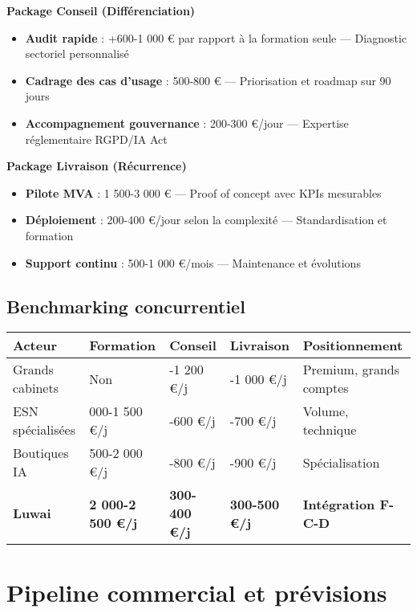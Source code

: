 \textbf{Package Conseil (Différenciation)}
\begin{itemize}
    \item \textbf{Audit rapide} : +600-1 000 € par rapport à la formation seule — Diagnostic sectoriel personnalisé
    \item \textbf{Cadrage des cas d’usage} : 500-800 € — Priorisation et roadmap sur 90 jours
    \item \textbf{Accompagnement gouvernance} : 200-300 €/jour — Expertise réglementaire RGPD/IA Act
\end{itemize}

\textbf{Package Livraison (Récurrence)}
\begin{itemize}
    \item \textbf{Pilote MVA} : 1 500-3 000 € — Proof of concept avec KPIs mesurables
    \item \textbf{Déploiement} : 200-400 €/jour selon la complexité — Standardisation et formation
    \item \textbf{Support continu} : 500-1 000 €/mois — Maintenance et évolutions
\end{itemize}

\subsection{Benchmarking concurrentiel}

\begin{longtable}{@{}>{\raggedright\arraybackslash}p{3.5cm}>{\raggedright\arraybackslash}p{2.8cm}>{\raggedright\arraybackslash}p{2.8cm}>{\raggedright\arraybackslash}p{2.8cm}>{\raggedright\arraybackslash}p{3.5cm}@{}}
\toprule
\textbf{Acteur} & \textbf{Formation} & \textbf{Conseil} & \textbf{Livraison} & \textbf{Positionnement} \\
\midrule
Grands cabinets & Non & 800-1 200 €/j & 600-1 000 €/j & Premium, grands comptes \\
ESN spécialisées & 1 000-1 500 €/j & 400-600 €/j & 400-700 €/j & Volume, technique \\
Boutiques IA & 1 500-2 000 €/j & 500-800 €/j & 500-900 €/j & Spécialisation \\
\textbf{Luwai} & \textbf{2 000-2 500 €/j} & \textbf{300-400 €/j} & \textbf{300-500 €/j} & \textbf{Intégration F-C-D} \\
\bottomrule
\end{longtable}

\section{Pipeline commercial et prévisions}


